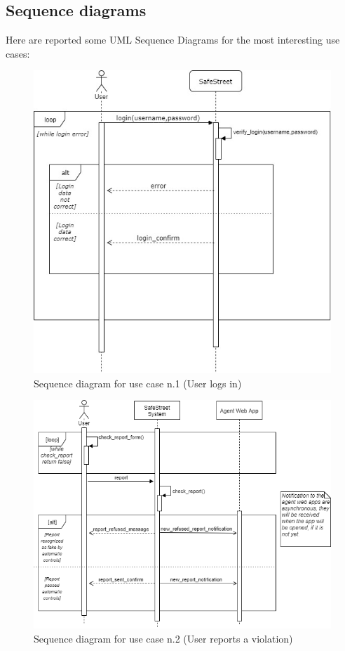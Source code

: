 \documentclass[a4paper]{report}
\begin{document}
\subsection{Sequence diagrams}
Here are reported some UML Sequence Diagrams for the most interesting use cases: \\
\begin{figure}[H]
\includegraphics[width=\textwidth]{SequenceUserLogin}
\caption{Sequence diagram for use case n.1 (User logs in) }
\label{fig:seq-userlogin}
\end{figure}

\begin{figure}[H]
\includegraphics[width=\textwidth]{SequenceSendReport}
\caption{Sequence diagram for use case n.2 (User reports a violation) }
\label{fig:seq-userreport}
\end{figure}
\end{document}
